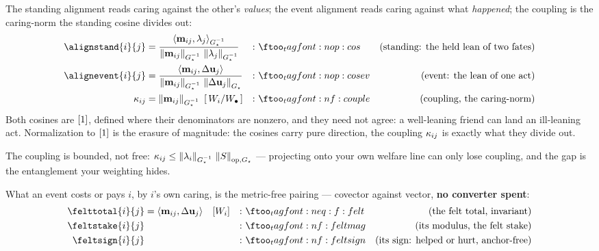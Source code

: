 \documentclass[../main]{subfiles}
\begin{document}
\begin{definition}
  The standing alignment reads caring against the other's \emph{values}; the event
  alignment reads caring against what \emph{happened}; the coupling is the caring-norm
  the standing cosine divides out:
  \begin{align}
    \alignstand{i}{j} &= \frac{\ipGcov{\caringcovector{i}{j}}{\feelingcovector{j}}}
      {\normGcov{\caringcovector{i}{j}}\,\normGcov{\feelingcovector{j}}}
      &:& \eqtag{op:cos}{standing: the held lean of two fates}\\
    \alignevent{i}{j} &= \frac{\pairing{\caringcovector{i}{j}}{\outcomechange{j}}}
      {\normGcov{\caringcovector{i}{j}}\,\normGvec{\outcomechange{j}}}
      &:& \eqtag{op:cosev}{event: the lean of one act}\\
    \coupling{i}{j} &= \normGcov{\caringcovector{i}{j}}\ \dimnodeperpublic{i}
      &:& \eqtag{f:couple}{coupling, the caring-norm}
  \end{align}
  Both cosines are $[1]$, defined where their denominators are nonzero, and they
  need not agree: a well-leaning friend can land an ill-leaning act. Normalization to
  $[1]$ is the erasure of magnitude: the cosines carry pure direction, the coupling
  $\kappa\sb{ ij }$ is exactly what they divide out.
\end{definition}

The coupling is bounded, not free:
$\kappa\sb{ ij }\le\left\lVert \lambda\sb{i} \right\rVert\sb{ \ensuremath{G\sb{\star}} \sp{-1}}\,\left\lVert S \right\rVert\sb{\mathrm{op}, \ensuremath{G\sb{\star}} }$ --- projecting onto your
own welfare line can only lose coupling, and the gap is the entanglement your weighting
hides.

\begin{definition}
  What an event costs or pays $i$, by $i$'s own caring, is the metric-free pairing ---
  covector against vector, \textbf{no converter spent}:
  \begin{align}
    \felttotal{i}{j} &= \pairing{\caringcovector{i}{j}}{\outcomechange{j}}
      \quad \dimnodewelfare{i}
      &:& \eqtag{eq:f:felt}{the felt total, invariant}\\
    \feltstake{i}{j} & &:& \eqtag{f:feltmag}{its modulus, the felt stake}\\
    \feltsign{i}{j}  & &:& \eqtag{f:feltsign}{its sign: helped or hurt, anchor-free}
  \end{align}
\end{definition}
\end{document}
